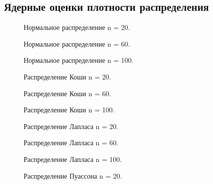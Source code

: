 \subsection{Ядерные оценки плотности распределения}
\begin{figure}[H]
	\caption{ Нормальное распределение n = 20.}
	\label{ris:16}
\end{figure}
\begin{figure}[H]
	\caption{ Нормальное распределение n = 60.}
	\label{ris:17}
\end{figure}
\begin{figure}[H]
	\caption{ Нормальное распределение n = 100.}
	\label{ris:18}
\end{figure}
\begin{figure}[H]
	\caption{ Распределение Коши n = 20.}
	\label{ris:19}
\end{figure}
\begin{figure}[H]
	\caption{ Распределение Коши n = 60.}
	\label{ris:20}
\end{figure}
\begin{figure}[H]
	\caption{ Распределение Коши n = 100.}
	\label{ris:21}
\end{figure}
\begin{figure}[H]
	\caption{ Распределение Лапласа n = 20.}
	\label{ris:22}
\end{figure}
\begin{figure}[H]
	\caption{ Распределение Лапласа n = 60.}
	\label{ris:23}
\end{figure}
\begin{figure}[H]
	\caption{ Распределение Лапласа n = 100.}
	\label{ris:24}
\end{figure}
\begin{figure}[H]
	\caption{ Распределение Пуассона n = 20.}
	\label{ris:25}
\end{figure}
